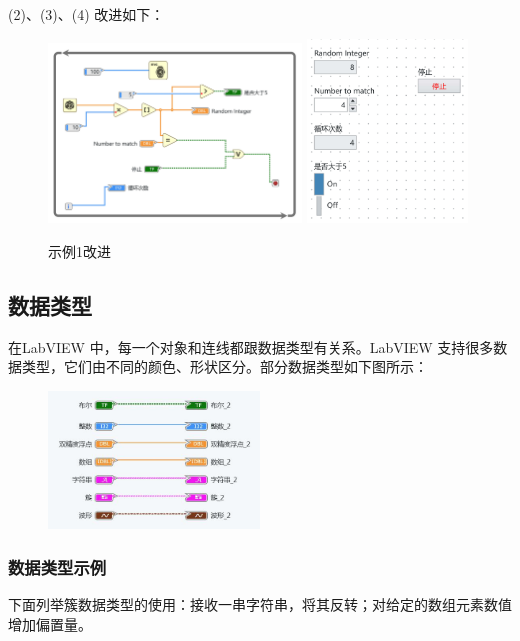 \documentclass{../source/Experiment}
\begin{document}
(2)、(3)、(4) 改进如下：
\begin{figure}[H]
    \centering
    \includegraphics[width = 0.6\textwidth]{lab8/lab1改进-a.jpg}
    \includegraphics[width = 0.38\textwidth]{lab8/lab1改进-b.jpg}
    \caption{示例1改进}
\end{figure}
\subsection{数据类型}
在LabVIEW 中，每一个对象和连线都跟数据类型有关系。LabVIEW 支持很多数据类型，它们由不同的颜色、形状区分。部分数据类型如下图所示：
\begin{figure}
    \centering
    \includegraphics[width = 0.5\textwidth]{lab8/fig1.jpg}
\end{figure}
\subsubsection{数据类型示例}
下面列举簇数据类型的使用：接收一串字符串，将其反转；对给定的数组元素数值增加偏置量。
\end{document}
